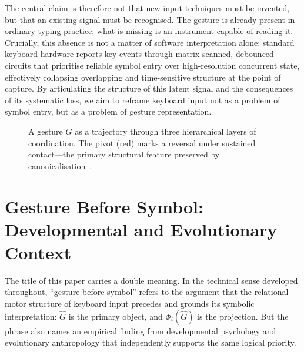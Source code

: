 \documentclass[11pt, a4paper]{article}
\begin{document}
The central claim is therefore not that new input techniques must be
invented, but that an existing signal must be recognised. The gesture is
already present in ordinary typing practice; what is missing is an
instrument capable of reading it. Crucially, this absence is not a
matter of software interpretation alone: standard keyboard hardware
reports key events through matrix-scanned, debounced circuits that
prioritise reliable symbol entry over high-resolution concurrent state,
effectively collapsing overlapping and time-sensitive structure at the
point of capture. By articulating the structure of this latent signal and
the consequences of its systematic loss, we aim to reframe keyboard
input not as a problem of symbol entry, but as a problem of gesture
representation.

\begin{figure}[h]
\centering
{}
\caption{A gesture $G$ as a trajectory through three hierarchical layers of
coordination. The pivot (red) marks a reversal under sustained contact---the
primary structural feature preserved by canonicalisation~\cite{cox2016}.}
\label{fig:layers}
\end{figure}

\section{Gesture Before Symbol: Developmental and Evolutionary Context}

The title of this paper carries a double meaning. In the technical sense
developed throughout, ``gesture before symbol'' refers to the argument
that the relational motor structure of keyboard input precedes and
grounds its symbolic interpretation: $\hat{G}$ is the primary object,
and $\Phi_i(\hat{G})$ is the projection. But the phrase also names an
empirical finding from developmental psychology and evolutionary
anthropology that independently supports the same logical priority.
\end{document}
